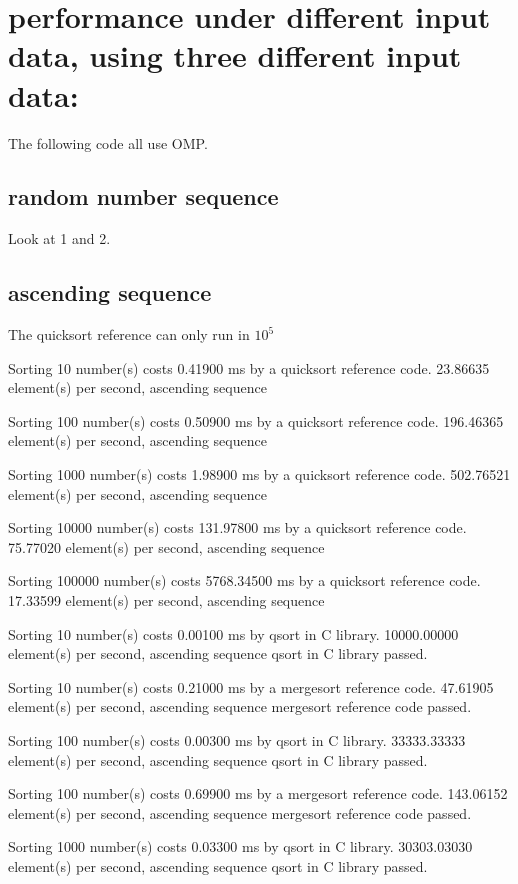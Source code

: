 \documentclass[12pt]{article}
\begin{document}
\section{performance under different input data, using three different input data:}

The following code all use OMP.

\subsection{random number sequence}

Look at 1 and 2.


\subsection{ascending sequence}

The quicksort reference can only run in $10^5$

Sorting 10 number(s) costs 0.41900 ms by a quicksort reference code. 23.86635 element(s) per second, ascending sequence

Sorting 100 number(s) costs 0.50900 ms by a quicksort reference code. 196.46365 element(s) per second, ascending sequence

Sorting 1000 number(s) costs 1.98900 ms by a quicksort reference code. 502.76521 element(s) per second, ascending sequence

Sorting 10000 number(s) costs 131.97800 ms by a quicksort reference code. 75.77020 element(s) per second, ascending sequence

Sorting 100000 number(s) costs 5768.34500 ms by a quicksort reference code. 17.33599 element(s) per second, ascending sequence

Sorting 10 number(s) costs 0.00100 ms by qsort in C library. 10000.00000 element(s) per second, ascending sequence
qsort in C library passed.

Sorting 10 number(s) costs 0.21000 ms by a mergesort reference code. 47.61905 element(s) per second, ascending sequence
mergesort reference code passed.

Sorting 100 number(s) costs 0.00300 ms by qsort in C library. 33333.33333 element(s) per second, ascending sequence
qsort in C library passed.

Sorting 100 number(s) costs 0.69900 ms by a mergesort reference code. 143.06152 element(s) per second, ascending sequence
mergesort reference code passed.

Sorting 1000 number(s) costs 0.03300 ms by qsort in C library. 30303.03030 element(s) per second, ascending sequence
qsort in C library passed.
\end{document}
